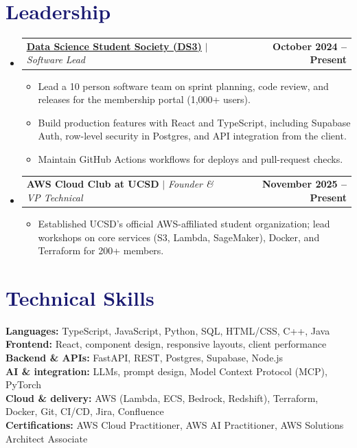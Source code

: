 \documentclass[letterpaper,11pt]{article}
\makeatletter
\newcommand{\resumeItem}[1]{
  \item\small{
    {#1 \vspace{-2pt}}
  }
}
\newcommand{\resumeProjectHeading}[2]{
    \item
    \begin{tabular*}{1.001\textwidth}{l@{\extracolsep{\fill}}r}
      \small#1 & \textbf{\small #2}\\
    \end{tabular*}\vspace{-7pt}
}
\newcommand{\resumeSubHeadingListStart}{\begin{itemize}[leftmargin=0.0in, label={}]}
\newcommand{\resumeSubHeadingListEnd}{\end{itemize}}
\newcommand{\resumeItemListStart}{\begin{itemize}}
\newcommand{\resumeItemListEnd}{\end{itemize}\vspace{-5pt}}
\newcommand\accentColor{MidnightBlue}
\makeatother
\begin{document}
\section{\textcolor{\accentColor}{Leadership}}
\vspace{-7pt}
\resumeSubHeadingListStart
\resumeProjectHeading{\textbf{\href{https://www.ds3atucsd.com/}{\underline{Data Science Student Society (DS3)}}} $|$ \emph{Software Lead}}{October 2024 -- Present}
\resumeItemListStart
\resumeItem{Lead a 10 person software team on sprint planning, code review, and releases for the membership portal (1,000+ users).}
\resumeItem{Build production features with React and TypeScript, including Supabase Auth, row-level security in Postgres, and API integration from the client.}
\resumeItem{Maintain GitHub Actions workflows for deploys and pull-request checks.}
\resumeItemListEnd
\vspace{-15pt}
\resumeProjectHeading{\textbf{AWS Cloud Club at UCSD} $|$ \emph{Founder \& VP Technical}}{November 2025 -- Present}
\resumeItemListStart
\resumeItem{Established UCSD's official AWS-affiliated student organization; lead workshops on core services (S3, Lambda, SageMaker), Docker, and Terraform for 200+ members.}
\resumeItemListEnd
\resumeSubHeadingListEnd
\vspace{-15pt}

\section{\textcolor{\accentColor}{Technical Skills}}
\begin{itemize}[leftmargin=0.15in, label={}]
  \small{\item{
        \textbf{Languages: }{TypeScript, JavaScript, Python, SQL, HTML/CSS, C++, Java} \\
        \textbf{Frontend: }{React, component design, responsive layouts, client performance} \\
        \textbf{Backend \& APIs: }{FastAPI, REST, Postgres, Supabase, Node.js} \\
        \textbf{AI \& integration: }{LLMs, prompt design, Model Context Protocol (MCP), PyTorch} \\
        \textbf{Cloud \& delivery: }{AWS (Lambda, ECS, Bedrock, Redshift), Terraform, Docker, Git, CI/CD, Jira, Confluence} \\
        \textbf{Certifications: }{AWS Cloud Practitioner, AWS AI Practitioner, AWS Solutions Architect Associate}
        }}
\end{itemize}
\vspace{-10pt}
\end{document}
